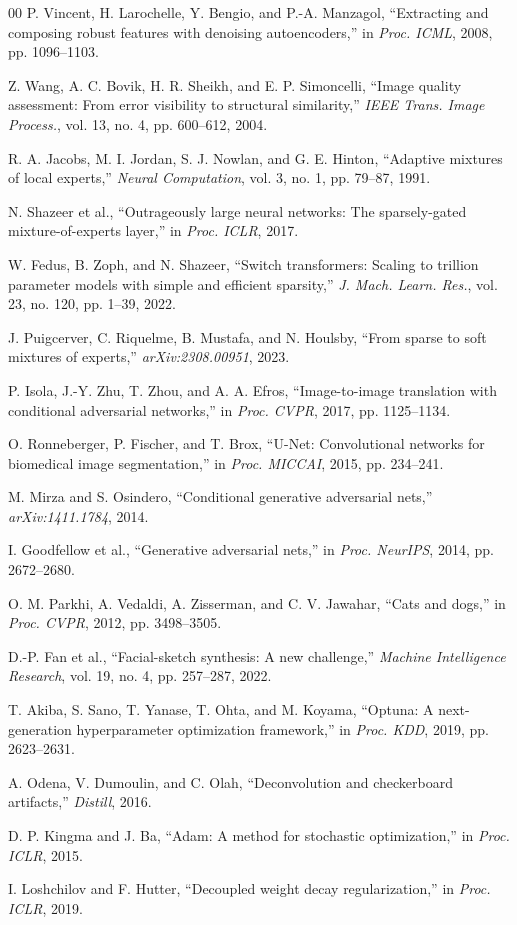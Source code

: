 \documentclass[conference]{IEEEtran}
\begin{document}
\begin{thebibliography}{00}
 P. Vincent, H. Larochelle, Y. Bengio, and P.-A. Manzagol,
``Extracting and composing robust features with denoising autoencoders,'' in
\emph{Proc. ICML}, 2008, pp. 1096--1103.

 Z. Wang, A. C. Bovik, H. R. Sheikh, and E. P. Simoncelli,
``Image quality assessment: From error visibility to structural similarity,''
\emph{IEEE Trans. Image Process.}, vol. 13, no. 4, pp. 600--612, 2004.

 R. A. Jacobs, M. I. Jordan, S. J. Nowlan, and G. E. Hinton,
``Adaptive mixtures of local experts,'' \emph{Neural Computation}, vol. 3,
no. 1, pp. 79--87, 1991.

 N. Shazeer et al., ``Outrageously large neural networks:
The sparsely-gated mixture-of-experts layer,'' in \emph{Proc. ICLR}, 2017.

 W. Fedus, B. Zoph, and N. Shazeer, ``Switch transformers:
Scaling to trillion parameter models with simple and efficient sparsity,''
\emph{J. Mach. Learn. Res.}, vol. 23, no. 120, pp. 1--39, 2022.

 J. Puigcerver, C. Riquelme, B. Mustafa, and N. Houlsby,
``From sparse to soft mixtures of experts,'' \emph{arXiv:2308.00951}, 2023.

 P. Isola, J.-Y. Zhu, T. Zhou, and A. A. Efros,
``Image-to-image translation with conditional adversarial networks,'' in
\emph{Proc. CVPR}, 2017, pp. 1125--1134.

 O. Ronneberger, P. Fischer, and T. Brox, ``U-Net:
Convolutional networks for biomedical image segmentation,'' in \emph{Proc.
MICCAI}, 2015, pp. 234--241.

 M. Mirza and S. Osindero, ``Conditional generative
adversarial nets,'' \emph{arXiv:1411.1784}, 2014.

 I. Goodfellow et al., ``Generative adversarial nets,''
in \emph{Proc. NeurIPS}, 2014, pp. 2672--2680.

 O. M. Parkhi, A. Vedaldi, A. Zisserman, and C. V. Jawahar,
``Cats and dogs,'' in \emph{Proc. CVPR}, 2012, pp. 3498--3505.

 D.-P. Fan et al., ``Facial-sketch synthesis: A new
challenge,'' \emph{Machine Intelligence Research}, vol. 19, no. 4,
pp. 257--287, 2022.

 T. Akiba, S. Sano, T. Yanase, T. Ohta, and M. Koyama,
``Optuna: A next-generation hyperparameter optimization framework,'' in
\emph{Proc. KDD}, 2019, pp. 2623--2631.

 A. Odena, V. Dumoulin, and C. Olah, ``Deconvolution and
checkerboard artifacts,'' \emph{Distill}, 2016.

 D. P. Kingma and J. Ba, ``Adam: A method for stochastic
optimization,'' in \emph{Proc. ICLR}, 2015.

 I. Loshchilov and F. Hutter, ``Decoupled weight decay
regularization,'' in \emph{Proc. ICLR}, 2019.
\end{thebibliography}
\end{document}
